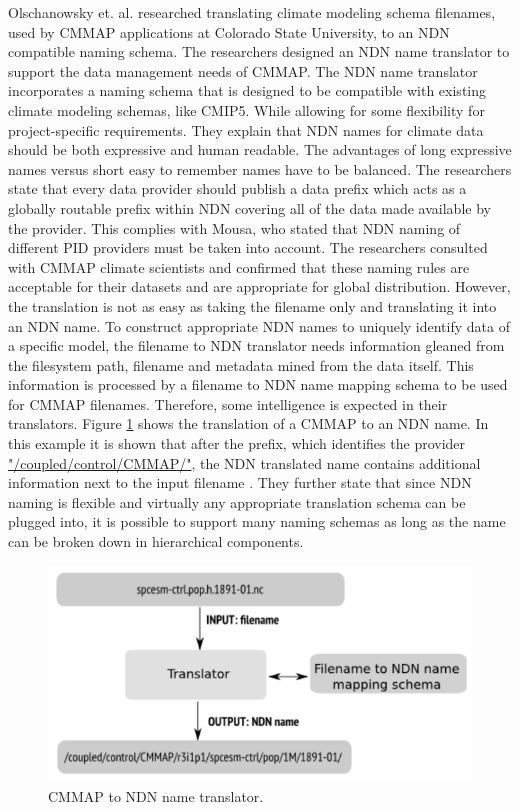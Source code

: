 Olschanowsky et. al. researched translating climate modeling schema filenames, used by CMMAP applications at Colorado State University, to an NDN compatible 
naming schema. The researchers designed an NDN name translator to support the data management needs of CMMAP. The NDN name translator incorporates a naming schema that is designed to be compatible with existing climate modeling schemas, like CMIP5. While allowing for some flexibility for project-specific requirements. They explain that NDN names for climate data should be both expressive and human readable. The advantages of long expressive names versus short easy to remember names have to be balanced.
The researchers state that every data provider should publish a data prefix which acts as a globally
routable prefix within NDN covering all of the data made available by the provider. This complies with Mousa, who stated that NDN naming of different PID providers must be taken into account. The researchers consulted with CMMAP climate scientists and confirmed that these naming rules are acceptable for their datasets and are appropriate for global distribution. 
However, the translation is not as easy as taking the filename only and translating it into an NDN name. To construct appropriate NDN names to uniquely identify data of a specific model, the filename to NDN translator needs information gleaned from the filesystem path, filename and metadata mined from the data itself. This information is processed by a filename to NDN name mapping schema to be used for CMMAP filenames. Therefore, some intelligence is expected in their translators.
Figure \ref{fig:cmmap_ndnn} shows the translation of a CMMAP to an NDN name. In this example it is shown that after the prefix, which identifies the provider \url{"/coupled/control/CMMAP/"}, the NDN translated name contains additional information next to the input filename \cite{ndn-clim}.
They further state that since NDN naming is flexible and virtually any appropriate
translation schema can be plugged into, it is possible to support many naming schemas as long as the 
name can be broken down in hierarchical components.

\begin{figure}[H]
\centering
\includegraphics[scale=0.4]{Images/cmip2ndn.png}
\caption{CMMAP to NDN name translator.}
\label{fig:cmmap_ndnn}
\end{figure}

